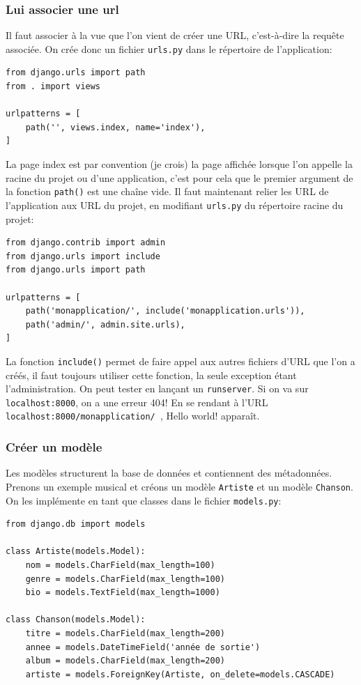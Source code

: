 \documentclass[a4paper, 10pt]{article}
\newcommand{\code}[1]{{\small\texttt{#1}}}
\begin{document}
\subsubsection{Lui associer une url}
Il faut associer à la vue que l'on vient de créer une URL, c'est-à-dire la requête associée. On crée donc un fichier \code{urls.py} dans le répertoire de l'application:
\begin{verbatim}
from django.urls import path
from . import views

urlpatterns = [
    path('', views.index, name='index'),
]
\end{verbatim}

La page \og index \fg{} est par convention (je crois) la page affichée lorsque l'on appelle la racine du projet ou d'une application, c'est pour cela que le premier argument de la fonction \code{path()} est une chaîne vide. Il faut maintenant relier les URL de l'application aux URL du projet, en modifiant \code{urls.py} du répertoire racine du projet:

\begin{verbatim}
from django.contrib import admin
from django.urls import include
from django.urls import path

urlpatterns = [
    path('monapplication/', include('monapplication.urls')),
    path('admin/', admin.site.urls),
]
\end{verbatim}

La fonction \code{include()} permet de faire appel aux autres fichiers d’URL que l'on a créés, il faut toujours utiliser cette fonction, la seule exception étant l'administration. On peut tester en lançant un \code{runserver}. Si on va sur \code{localhost:8000}, on a une erreur 404! En se rendant à l'URL \code{localhost:8000/monapplication/ }, Hello world! apparaît.

\subsubsection{Créer un modèle}
Les modèles structurent la base de données et contiennent des métadonnées. Prenons un exemple musical et créons un modèle \code{Artiste} et un modèle \code{Chanson}. On les implémente en tant que classes dans le fichier \code{models.py}:
\begin{verbatim}
from django.db import models

class Artiste(models.Model):
    nom = models.CharField(max_length=100)
    genre = models.CharField(max_length=100)
    bio = models.TextField(max_length=1000)

class Chanson(models.Model):
    titre = models.CharField(max_length=200)
    annee = models.DateTimeField('année de sortie')
    album = models.CharField(max_length=200)
    artiste = models.ForeignKey(Artiste, on_delete=models.CASCADE)
\end{verbatim}
\end{document}
